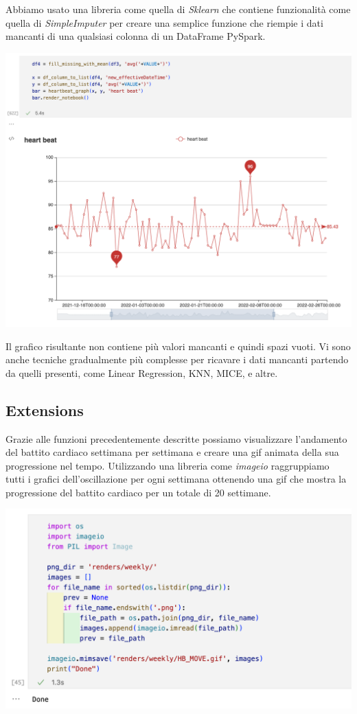 \documentclass[11pt, oneside]{article}
\begin{document}
Abbiamo usato una libreria come quella di \emph{Sklearn} che contiene funzionalità come quella di \emph{SimpleImputer} per creare una semplice funzione che riempie i dati mancanti di una qualsiasi colonna di un DataFrame PySpark.

\begin{center}
\includegraphics[scale=0.45]{4_hb_mean.png}
\end{center}

Il grafico risultante non contiene più valori mancanti e quindi spazi vuoti. Vi sono anche tecniche gradualmente più complesse per ricavare i dati mancanti partendo da quelli presenti, come Linear Regression, KNN, MICE, e altre.

\subsection{Extensions}

Grazie alle funzioni precedentemente descritte possiamo visualizzare l'andamento del battito cardiaco settimana per settimana e creare una gif animata della sua progressione nel tempo. Utilizzando una libreria come \emph{imageio} raggruppiamo tutti i grafici dell'oscillazione per ogni settimana ottenendo una gif che mostra la progressione del battito cardiaco per un totale di 20 settimane.  

\begin{center}
\includegraphics[scale=0.45]{5_gif.png}
\end{center}
\end{document}
